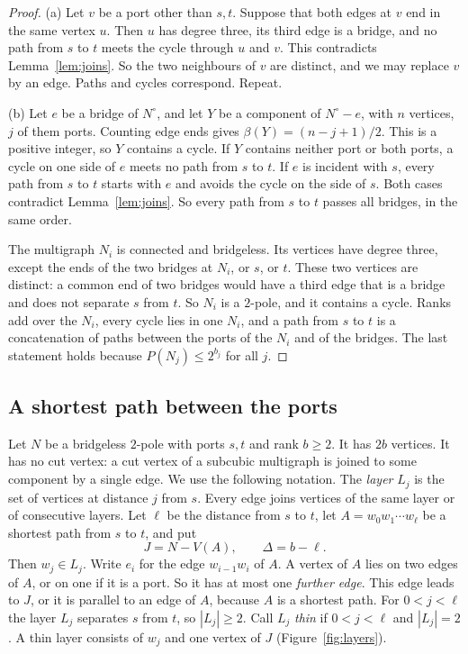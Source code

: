 \begin{proof}
(a) Let $v$ be a port other than $s,t$. Suppose that both edges at $v$ end in the same vertex $u$.
Then $u$ has degree three, its third edge is a bridge, and no path from $s$ to $t$ meets the cycle
through $u$ and $v$. This contradicts Lemma~\ref{lem:joins}. So the two neighbours of $v$ are
distinct, and we may replace $v$ by an edge. Paths and cycles correspond. Repeat.

(b) Let $e$ be a bridge of $N^{\circ}$, and let $Y$ be a component of $N^{\circ}-e$, with $n$
vertices, $j$ of them ports. Counting edge ends gives $\beta(Y)=(n-j+1)/2$. This is a positive
integer, so $Y$ contains a cycle. If $Y$ contains neither port or both ports, a cycle on one side
of $e$ meets no path from $s$ to $t$. If $e$ is incident with $s$, every path from $s$ to $t$
starts with $e$ and avoids the cycle on the side of $s$. Both cases contradict
Lemma~\ref{lem:joins}. So every path from $s$ to $t$ passes all bridges, in the same order.

The multigraph $N_i$ is connected and bridgeless. Its vertices have degree three, except the ends
of the two bridges at $N_i$, or $s$, or $t$. These two vertices are distinct: a common end of two
bridges would have a third edge that is a bridge and does not separate $s$ from $t$. So $N_i$ is a
$2$-pole, and it contains a cycle. Ranks add over the $N_i$, every cycle lies in one $N_i$, and a
path from $s$ to $t$ is a concatenation of paths between the ports of the $N_i$ and of the bridges.
The last statement holds because $P(N_j)\le2^{b_j}$ for all $j$.
\end{proof}

\subsection{A shortest path between the ports}\label{sec:shape}

Let $N$ be a bridgeless $2$-pole with ports $s,t$ and rank $b\ge2$. It has $2b$ vertices. It has no
cut vertex: a cut vertex of a subcubic multigraph is joined to some component by a single edge.
We use the following notation. The \emph{layer} $L_j$ is the set of vertices at distance $j$ from
$s$. Every edge joins vertices of the same layer or of consecutive layers. Let $\ell$ be the
distance from $s$ to $t$, let $A=w_0w_1\cdots w_\ell$ be a shortest path from $s$ to $t$, and put
\[
  J=N-V(A),\qquad\Delta=b-\ell .
\]
Then $w_j\in L_j$. Write $e_i$ for the edge $w_{i-1}w_i$ of $A$. A vertex of $A$ lies on two edges
of $A$, or on one if it is a port. So it has at most one \emph{further edge}. This edge leads to
$J$, or it is parallel to an edge of $A$, because $A$ is a shortest path. For $0<j<\ell$ the layer
$L_j$ separates $s$ from $t$, so $|L_j|\ge2$. Call $L_j$ \emph{thin} if $0<j<\ell$ and $|L_j|=2$.
A thin layer consists of $w_j$ and one vertex of $J$ (Figure~\ref{fig:layers}).

